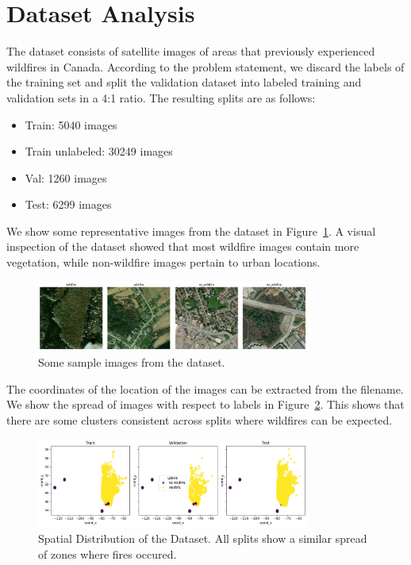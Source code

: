 \documentclass{article}
\begin{document}
\section{Dataset Analysis}

The dataset consists of satellite images of areas that previously experienced
wildfires in Canada. According to the problem statement, we discard the labels
of the training set and split the validation dataset into labeled training and
validation sets in a 4:1 ratio. The resulting splits are as follows:

\begin{itemize}
  \item Train: 5040 images
  \item Train unlabeled: 30249 images
  \item Val: 1260 images
  \item Test: 6299 images
\end{itemize}

We show some representative images from the dataset in
Figure~\ref{fig:samples}. A visual inspection of the dataset showed that most
wildfire images contain more vegetation, while non-wildfire images pertain to
urban locations.

\begin{figure}
  \centering
  \includegraphics[width=0.8\textwidth]{figures/samples2.png}
  \caption{Some sample images from the dataset.}
  \label{fig:samples}
\end{figure}

The coordinates of the location of the images can be extracted from the
filename. We show the spread of images with respect to labels in
Figure~\ref{fig:coordinate_analysis}. This shows that there are some clusters
consistent across splits where wildfires can be expected.

\begin{figure}
  \centering
  \includegraphics[width=0.8\textwidth]{figures/coord_label.png}
  \caption{Spatial Distribution of the Dataset. All splits show a similar spread of zones where fires occured.}
  \label{fig:coordinate_analysis}
\end{figure}
\end{document}
